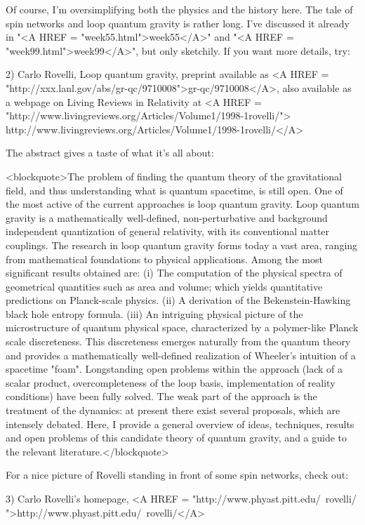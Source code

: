 Of course, I'm oversimplifying both the physics and the history here.
The tale of spin networks and loop quantum gravity is rather long.  I've
discussed it already in "<A HREF = "week55.html">week55</A>" and "<A HREF = "week99.html">week99</A>", but only sketchily.  If
you want more details, try:

2) Carlo Rovelli, Loop quantum gravity, preprint available as
<A HREF = "http://xxx.lanl.gov/abs/gr-qc/9710008">gr-qc/9710008</A>,
also available as a webpage on Living Reviews in Relativity at
<A HREF = "http://www.livingreviews.org/Articles/Volume1/1998-1rovelli/">
http://www.livingreviews.org/Articles/Volume1/1998-1rovelli/</A>
 
The abstract gives a taste of what it's all about:

<blockquote>The problem of finding the quantum theory of the gravitational 
field,
and thus understanding what is quantum spacetime, is still open.  One of
the most active of the current approaches is loop quantum gravity.  Loop
quantum gravity is a mathematically well-defined, non-perturbative and
background independent quantization of general relativity, with its
conventional matter couplings.  The research in loop quantum gravity
forms today a vast area, ranging from mathematical foundations to
physical applications.  Among the most significant results obtained are:
(i) The computation of the physical spectra of geometrical quantities
such as area and volume; which yields quantitative predictions on
Planck-scale physics. 
(ii) A derivation of the Bekenstein-Hawking black
hole entropy formula. 
(iii) An intriguing physical picture of the
microstructure of quantum physical space, characterized by a
polymer-like Planck scale discreteness.  This discreteness emerges
naturally from the quantum theory and provides a mathematically
well-defined realization of Wheeler's intuition of a spacetime "foam".
Longstanding open problems within the approach (lack of a scalar
product, overcompleteness of the loop basis, implementation of reality
conditions) have been fully solved. The weak part of the approach is the
treatment of the dynamics: at present there exist several proposals,
which are intensely debated.  Here, I provide a general overview of
ideas, techniques, results and open problems of this candidate theory of
quantum gravity, and a guide to the relevant literature.</blockquote>

For a nice picture of Rovelli standing in front of some spin networks,
check out:

3) Carlo Rovelli's homepage, <A HREF =
"http://www.phyast.pitt.edu/~rovelli/
">http://www.phyast.pitt.edu/~rovelli/</A> 


